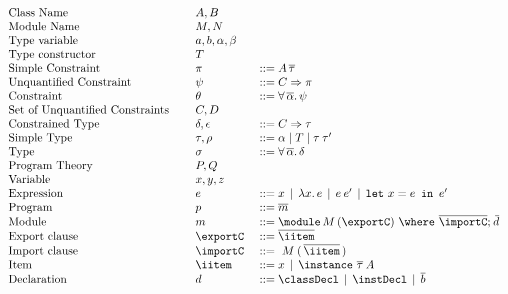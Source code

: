 \begin{figure} 

\[ \begin{array}[c]{llll}
\textrm{Class Name}         &\hspace{.1cm} & A,B            & \\
\textrm{Module Name}        &              & M,N            & \\
\textrm{Type variable}      &         & a,b,\alpha,\beta & \\
\textrm{Type constructor}   &         & T              & \\
\textrm{Simple Constraint}  &         & \pi            & ::= A\,\overline{\tau}\\
\textrm{Unquantified Constraint} &    & \psi           & ::= C\Rightarrow \pi\\
\textrm{Constraint}         &         & \theta         & ::= \forall\,\overline{\alpha}.\,\psi\\
\textrm{Set of Unquantified Constraints} &   & C,D      & \\
\textrm{Constrained Type}   &         & \delta,\epsilon & ::= C\Rightarrow \tau\\
\textrm{Simple Type}        &         & \tau, \rho     & ::= \alpha \mid T \mid \tau\:\tau' \\
\textrm{Type}               &         & \sigma         & ::= \forall\,\overline{\alpha}.\,\delta\\
\textrm{Program Theory}     &         & P,Q            &\\
\textrm{Variable}           &         & x, y, z        &\\
\textrm{Expression}         &         & e              & ::= x \,\mid\, \lambda x.\,e  \,\mid\, e\:e' \,\mid\, \mlet x = e\,\iin\,e'\\ 
\textrm{Program}            &         & p              & ::= \overline{m}\\
\textrm{Module}             &         & m              & ::= \module\, M\, (\exportC) \ \where\ \overline{\importC};\: \overline{\!d}\\
\textrm{Export clause}      &         & \exportC\      & ::= \overline{\iitem}\\
\textrm{Import clause}      &         & \importC\      & ::= \ M\: (\,\overline{\iitem}\,)\\
\textrm{Item}               &         & \iitem         & ::= x \,\mid\, \instance\ \overline{\tau}\: A\\ 
\textrm{Declaration}        &         & d              & ::= \classDecl \,\mid\, \instDecl \,\mid\, \overline{b}\\

\end{array}\]
\end{figure}
